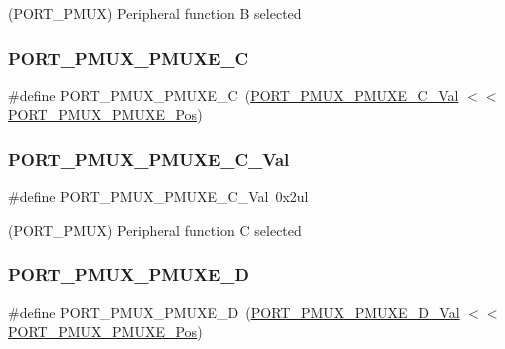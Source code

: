 (P\+O\+R\+T\+\_\+\+P\+M\+UX) Peripheral function B selected 

\mbox{\label{group___s_a_m_d21___p_o_r_t_ga2dfaf48078b6c1ca36e8a3f0dbf04e3f}} 
\subsubsection{\texorpdfstring{PORT\_PMUX\_PMUXE\_C}{PORT\_PMUX\_PMUXE\_C}}
{\footnotesize\ttfamily \#define P\+O\+R\+T\+\_\+\+P\+M\+U\+X\+\_\+\+P\+M\+U\+X\+E\+\_\+C~(\mbox{\hyperlink{group___s_a_m_d21___p_o_r_t_gab47780ac1a22bc26130c2d72803aaf4a}{P\+O\+R\+T\+\_\+\+P\+M\+U\+X\+\_\+\+P\+M\+U\+X\+E\+\_\+\+C\+\_\+\+Val}}         $<$$<$ \mbox{\hyperlink{group___s_a_m_d21___p_o_r_t_ga38a4c4871ecabeb4ad36398b73685bac}{P\+O\+R\+T\+\_\+\+P\+M\+U\+X\+\_\+\+P\+M\+U\+X\+E\+\_\+\+Pos}})}

\mbox{\label{group___s_a_m_d21___p_o_r_t_gab47780ac1a22bc26130c2d72803aaf4a}} 
\subsubsection{\texorpdfstring{PORT\_PMUX\_PMUXE\_C\_Val}{PORT\_PMUX\_PMUXE\_C\_Val}}
{\footnotesize\ttfamily \#define P\+O\+R\+T\+\_\+\+P\+M\+U\+X\+\_\+\+P\+M\+U\+X\+E\+\_\+\+C\+\_\+\+Val~0x2ul}



(P\+O\+R\+T\+\_\+\+P\+M\+UX) Peripheral function C selected 

\mbox{\label{group___s_a_m_d21___p_o_r_t_ga8db62e7045ce8186a3e3c84408fec41f}} 
\subsubsection{\texorpdfstring{PORT\_PMUX\_PMUXE\_D}{PORT\_PMUX\_PMUXE\_D}}
{\footnotesize\ttfamily \#define P\+O\+R\+T\+\_\+\+P\+M\+U\+X\+\_\+\+P\+M\+U\+X\+E\+\_\+D~(\mbox{\hyperlink{group___s_a_m_d21___p_o_r_t_ga934efa06dffb41353e14a0d649351797}{P\+O\+R\+T\+\_\+\+P\+M\+U\+X\+\_\+\+P\+M\+U\+X\+E\+\_\+\+D\+\_\+\+Val}}         $<$$<$ \mbox{\hyperlink{group___s_a_m_d21___p_o_r_t_ga38a4c4871ecabeb4ad36398b73685bac}{P\+O\+R\+T\+\_\+\+P\+M\+U\+X\+\_\+\+P\+M\+U\+X\+E\+\_\+\+Pos}})}

